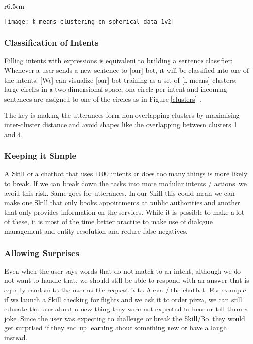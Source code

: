 \hspace*{-\parindent}%
\begin{minipage}[H]{\linewidth}

\begin{wrapfigure}{r}{6.5cm}
	\caption[K-means Clusters Example] {K-means Clusters of Utterances, based on Deschamps \cite{botbestbractis}}
	\label{clusters}
	\centering
	\texttt{[image: k-means-clustering-on-spherical-data-1v2]} 
\end{wrapfigure}




\subsubsection*{Classification of Intents}
Filling intents with expressions is equivalent to building a sentence classifier: Whenever a user sends a new sentence to [our] bot, it will be classified into one of the intents. [We] can visualize [our] bot training as a set of [k-means] clusters: large circles  in a two-dimensional space, one circle per intent and incoming sentences are assigned to one of the circles as in Figure \ref{clusters} \cite{botbestbractis}.

The key is making the utterances form non-overlapping clusters by maximising inter-cluster distance and avoid shapes like the overlapping between clusters 1 and 4.

\end{minipage}


\subsubsection*{Keeping it Simple}

A Skill or a chatbot that uses 1000 intents or does too many things is more likely to break. If we can break down the tasks into more modular intents / actions, we avoid this risk. Same goes for utterances. In our Skill this could mean we can make one Skill that only books appointments at public authorities and another that only provides information on the services. While it is possible to make a lot of these, it is most of the time better practice to make use of dialogue management and entity resolution and reduce false negatives.


\subsubsection*{Allowing Surprises}
Even when the user says words that do not match to an intent, although we do not want to handle that, we should still be able to respond with an answer that is equally random to the user as the request is to Alexa / the chatbot. For example if we launch a Skill checking for flights and we ask it to order pizza, we can still educate the user about a new thing they were not expected to hear or tell them a joke. Since the user was expecting to challenge or break the Skill/Bo\, they would get surprised if they end up learning about something new or have a laugh instead.

